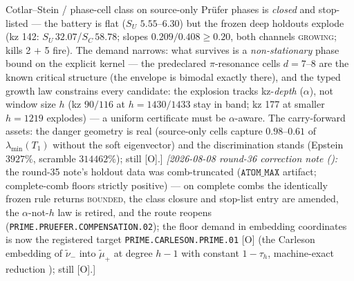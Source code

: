 {Cotlar--Stein / phase-cell class on source-only Pr\"ufer phases
is \emph{closed} and stop-listed --- the battery is flat ($S_U$
$5.55$--$6.30$) but the frozen deep holdouts explode (kz 142:
$S_U\,32.07$/$S_C\,58.78$; slopes $0.209/0.408 \ge 0.20$, both
channels \textsc{growing}; kills 2 $+$ 5 fire).  The demand
narrows: what survives is a \emph{non-stationary} phase bound on
the explicit kernel --- the predeclared $\pi$-resonance cells
$d = 7$--$8$ are the known critical structure (the envelope is
bimodal exactly there), and the typed growth law constrains
every candidate: the explosion tracks kz-\emph{depth} ($\alpha$),
not window size $h$ (kz $90/116$ at $h = 1430/1433$ stay in
band; kz 177 at smaller $h = 1219$ explodes) --- a uniform
certificate must be $\alpha$-aware.  The carry-forward assets:
the danger geometry is real (source-only cells capture
$0.98$--$0.61$ of $\lambda_{\min}(T_1)$ without the soft
eigenvector) and the discrimination stands (Epstein $3927\%$,
scramble $314462\%$); still [O].]
\emph{[2026-08-08 round-36 correction note
():} the round-35 note's
holdout data was comb-truncated ($\texttt{ATOM\_MAX}$ artifact;
complete-comb floors strictly positive) --- on complete combs
the identically frozen rule returns \textsc{bounded}, the class
closure and stop-list entry are amended, the $\alpha$-not-$h$
law is retired, and the route reopens
(\texttt{PRIME.PRUEFER.COMPENSATION.02}); the floor demand in
embedding coordinates is now the registered target
\texttt{PRIME.CARLESON.PRIME.01} [O] (the Carleson embedding of
$\tilde\nu_-$ into $\tilde\mu_+$ at degree $h{-}1$ with constant
$1 - \tau_h$, machine-exact reduction
); still [O].]\par}


